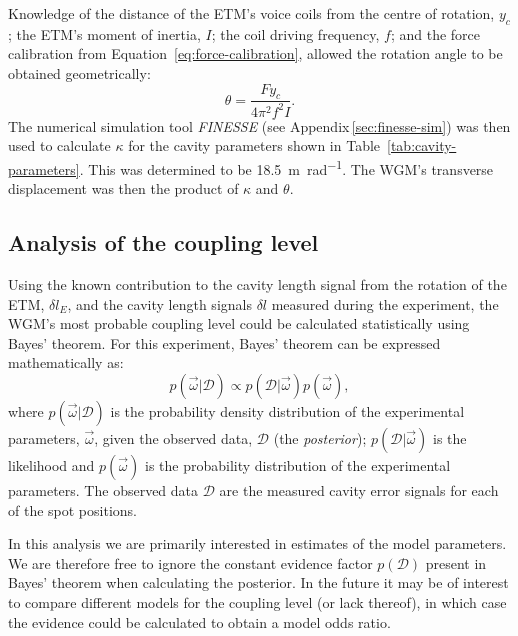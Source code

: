 Knowledge of the distance of the \gls{ETM}'s voice coils from the centre of rotation, $y_c$; the \gls{ETM}'s moment of inertia, $I$; the coil driving frequency, $f$; and the force calibration from Equation~\ref{eq:force-calibration}, allowed the rotation angle to be obtained geometrically:
\begin{equation}
  \theta = \frac{F y_c}{4 \pi^2 f^2 I}.
  \label{eq:rotation-calibration}
\end{equation}
The numerical simulation tool \emph{\gls{FINESSE}} (see Appendix\,\ref{sec:finesse-sim}) was then used to calculate $\kappa$ for the cavity parameters shown in Table~\ref{tab:cavity-parameters}. This was determined to be \SI{18.5}{\meter \per \radian}. The \gls{WGM}'s transverse displacement was then the product of $\kappa$ and $\theta$.

\subsection{Analysis of the coupling level}
\label{sec:simulations}
Using the known contribution to the cavity length signal from the rotation of the \gls{ETM}, $\delta l_E$, and the cavity length signals $\delta l$ measured during the experiment, the \gls{WGM}'s most probable coupling level could be calculated statistically using Bayes' theorem. For this experiment, Bayes' theorem can be expressed mathematically as:
\begin{equation}
  p \left( \vec{\omega} | \mathcal{D} \right) \propto p \left( \mathcal{D} | \vec{\omega} \right) p \left( \vec{\omega} \right),
  \label{eq:bayes}
\end{equation}
where $p \left( \vec{\omega} | \mathcal{D} \right)$ is the probability density distribution of the experimental parameters, $\vec{\omega}$, given the observed data, $\mathcal{D}$ (the \emph{posterior}); $p \left( \mathcal{D} | \vec{\omega} \right)$ is the likelihood and $p \left( \vec{\omega} \right)$ is the probability distribution of the experimental parameters. The observed data $\mathcal{D}$ are the measured cavity error signals for each of the spot positions.

In this analysis we are primarily interested in estimates of the model parameters. We are therefore free to ignore the constant evidence factor $p \left( \mathcal{D} \right)$ present in Bayes' theorem when calculating the posterior. In the future it may be of interest to compare different models for the coupling level (or lack thereof), in which case the evidence could be calculated to obtain a model odds ratio.

